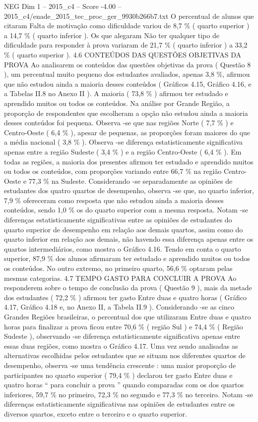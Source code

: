 \begin{textsample}{NEG Dim 1 – 2015\_c4 – Score -4.00 – 2015\_c4/enade\_2015\_tec\_proc\_ger\_9930b266b7.txt}
O percentual de alunos que citaram Falta de motivação como dificuldade variou de 8,7 \% ( quarto superior ) a 14,7 \% ( quarto inferior ).
Os que alegaram Não ter qualquer tipo de dificuldade para responder à prova variaram de 21,7 \% ( quarto inferior ) a 33,2 \% ( quarto superior ). 4.6 CONTEÚDOS DAS QUESTÕES OBJETIVAS DA PROVA Ao analisarem os conteúdos das questões objetivas da prova ( Questão 8 ), um percentual muito pequeno dos estudantes avaliados, apenas 3,8 \%, afirmou que não estudou ainda a maioria desses conteúdos ( Gráficos 4.15, Gráfico 4.16, e a Tabelas II.8 no Anexo II ).
A maioria ( 73,8 \% ) afirmou ter estudado e aprendido muitos ou todos os conteúdos.
Na análise por Grande Região, a proporção de respondentes que escolheram a opção não estudou ainda a maioria desses conteúdos foi pequena.
Observa -se que nas regiões Norte ( 7,7 \% ) e Centro-Oeste ( 6,4 \% ), apesar de pequenas, as proporções foram maiores do que a média nacional ( 3,8 \% ).
Observa -se diferença estatisticamente significativa apenas entre a região Sudeste ( 3,4 \% ) e a região Centro-Oeste ( 6,4 \% ).
Em todas as regiões, a maioria dos presentes afirmou ter estudado e aprendido muitos ou todos os conteúdos, com proporções variando entre 66,7 \% na região Centro-Oeste e 77,3 \% na Sudeste.
Considerando -se separadamente as opiniões de estudantes dos quatro quartos de desempenho, observa -se que, no quarto inferior, 7,9 \% ofereceram como resposta que não estudou ainda a maioria desses conteúdos, sendo 1,0 \% os do quarto superior com a mesma resposta.
Notam -se diferenças estatisticamente significativas entre as opiniões de estudantes do quarto superior de desempenho em relação aos demais quartos, assim como do quarto inferior em relação aos demais, não havendo essa diferença apenas entre os quartos intermediários, como mostra o Gráfico 4.16.
Tendo em conta o quarto superior, 87,9 \% dos alunos afirmaram ter estudado e aprendido muitos ou todos os conteúdos.
No outro extremo, no primeiro quarto, 56,6 \% optaram pelas mesmas categorias. 4.7 TEMPO GASTO PARA CONCLUIR A PROVA Ao responderem sobre o tempo de conclusão da prova ( Questão 9 ), mais da metade dos estudantes ( 72,2 \% ) afirmou ter gasto Entre duas e quatro horas ( Gráfico 4.17, Gráfico 4.18 e, no Anexo II, a Tabela II.9 ).
Considerando -se as cinco Grandes Regiões brasileiras, o percentual dos que utilizaram Entre duas e quatro horas para finalizar a prova ficou entre 70,6 \% ( região Sul ) e 74,4 \% ( Região Sudeste ), observando -se diferença estatisticamente significativa apenas entre essas duas regiões, como mostra o Gráfico 4.17.
Uma vez sendo analisadas as alternativas escolhidas pelos estudantes que se situam nos diferentes quartos de desempenho, observa -se uma tendência crescente : uma maior proporção de participantes no quarto superior ( 79,4 \% ) declarou ter gasto Entre duas e quatro horas “ para concluir a prova ” quando comparadas com os dos quartos inferiores, 59,7 \% no primeiro, 72,3 \% no segundo e 77,3 \% no terceiro.
Notam -se diferenças estatisticamente significativas nas opiniões de estudantes entre os diversos quartos, exceto entre o terceiro e o quarto superior.

\end{textsample}
